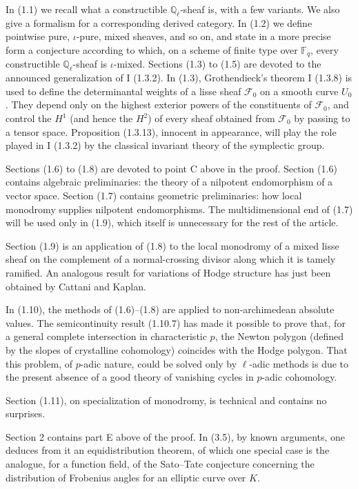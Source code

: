 \documentclass[11pt]{article}
\theoremstyle{remark}
\newcommand{\Ql}{\mathbb{Q}_\ell}
\newcommand{\Fq}{\mathbb{F}_q}
\begin{document}
In (1.1) we recall what a constructible $\Ql$-sheaf is, with a few variants. We also give a formalism for a corresponding derived category. In (1.2) we define pointwise pure, $\iota$-pure, mixed sheaves, and so on, and state in a more precise form a conjecture according to which, on a scheme of finite type over $\Fq$, every constructible $\Ql$-sheaf is $\iota$-mixed. Sections (1.3) to (1.5) are devoted to the announced generalization of I (1.3.2). In (1.3), Grothendieck's theorem I (1.3.8) is used to define the determinantal weights of a lisse sheaf $\mathcal F_0$ on a smooth curve $U_0$. They depend only on the highest exterior powers of the constituents of $\mathcal F_0$, and control the $H^1$ (and hence the $H^2$) of every sheaf obtained from $\mathcal F_0$ by passing to a tensor space. Proposition (1.3.13), innocent in appearance, will play the role played in I (1.3.2) by the classical invariant theory of the symplectic group.

Sections (1.6) to (1.8) are devoted to point C above in the proof. Section (1.6) contains algebraic preliminaries: the theory of a nilpotent endomorphism of a vector space. Section (1.7) contains geometric preliminaries: how local monodromy supplies nilpotent endomorphisms. The multidimensional end of (1.7) will be used only in (1.9), which itself is unnecessary for the rest of the article.

Section (1.9) is an application of (1.8) to the local monodromy of a mixed lisse sheaf on the complement of a normal-crossing divisor along which it is tamely ramified. An analogous result for variations of Hodge structure has just been obtained by Cattani and Kaplan.

In (1.10), the methods of (1.6)--(1.8) are applied to non-archimedean absolute values. The semicontinuity result (1.10.7) has made it possible to prove that, for a general complete intersection in characteristic $p$, the Newton polygon (defined by the slopes of crystalline cohomology) coincides with the Hodge polygon. That this problem, of $p$-adic nature, could be solved only by $\ell$-adic methods is due to the present absence of a good theory of vanishing cycles in $p$-adic cohomology.

Section (1.11), on specialization of monodromy, is technical and contains no surprises.

Section 2 contains part E above of the proof. In (3.5), by known arguments, one deduces from it an equidistribution theorem, of which one special case is the analogue, for a function field, of the Sato--Tate conjecture concerning the distribution of Frobenius angles for an elliptic curve over $K$.
\end{document}
